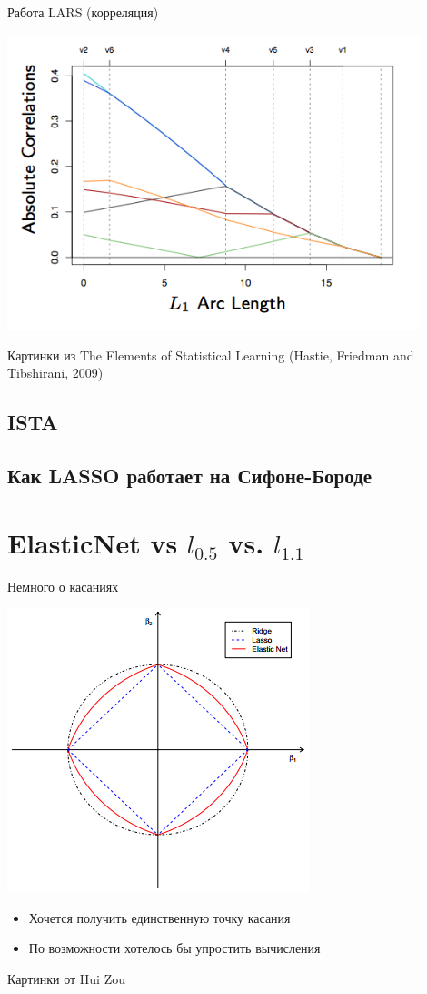 \documentclass[14pt, fleqn, xcolor={dvipsnames, table}]{beamer}
\begin{document}
\begin{frame}{Работа LARS (корреляция)}
\begin{center}
\includegraphics[width=0.9\textwidth]{3_14.png} 
\end{center}
\footnotesize
Картинки из The Elements of Statistical Learning (Hastie, Friedman and Tibshirani, 2009)
\end{frame}

\subsection{ISTA}
\subsection{Как LASSO работает на Сифоне-Бороде}

\section{ElasticNet vs $l_{0.5}$ vs. $l_{1.1}$}
\begin{frame}{Немного о касаниях}
\begin{center}
\includegraphics[height=0.9\textheight]{ElasticNet.png} 
\end{center}
\footnotesize
\begin{itemize}
  \item Хочется получить единственную точку касания
  \item По возможности хотелось бы упростить вычисления
\end{itemize}
Картинки от Hui Zou
\end{frame}
\end{document}
